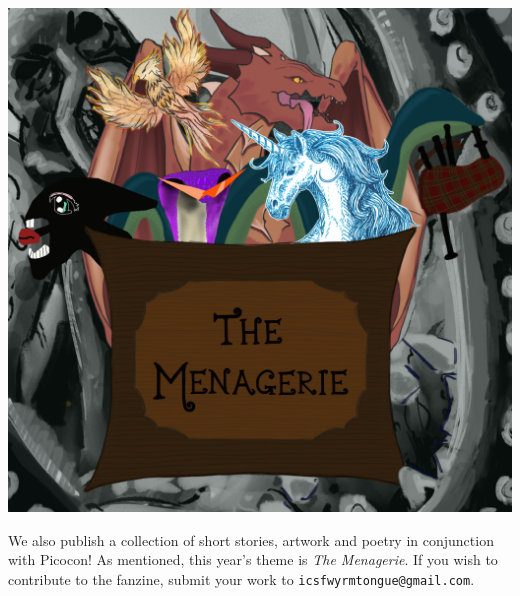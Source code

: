 
\begin{center}
    \includegraphics[height=\textwidth]{img/info/picocon-the-menagerie.png}
\end{center}

We also publish a collection of short stories, artwork and poetry in conjunction with Picocon! As mentioned, this year's theme is \textit{The Menagerie}. If you wish to contribute to the fanzine, submit your work to \texttt{icsfwyrmtongue@gmail.com}\footnotemark[2]. 
